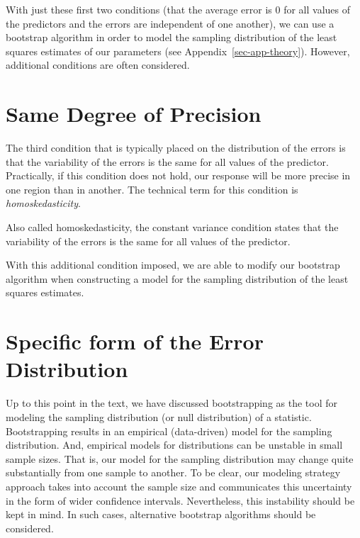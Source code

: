 \documentclass[
  letterpaper,
  DIV=11,
  numbers=noendperiod]{scrreprt}
\theoremstyle{definition}
\theoremstyle{definition}
\theoremstyle{plain}
\theoremstyle{remark}
\begin{document}
With just these first two conditions (that the average error is 0 for
all values of the predictors and the errors are independent of one
another), we can use a bootstrap algorithm in order to model the
sampling distribution of the least squares estimates of our parameters
(see Appendix~\ref{sec-app-theory}). However, additional conditions are
often considered.

\section{Same Degree of Precision}\label{same-degree-of-precision}

The third condition that is typically placed on the distribution of the
errors is that the variability of the errors is the same for all values
of the predictor. Practically, if this condition does not hold, our
response will be more precise in one region than in another. The
technical term for this condition is \emph{homoskedasticity}.

\begin{tcolorbox}[enhanced jigsaw, colbacktitle=quarto-callout-note-color!10!white, colback=white, left=2mm, title=\textcolor{quarto-callout-note-color}{\faInfo}\hspace{0.5em}{Constant Variance}, toptitle=1mm, leftrule=.75mm, breakable, bottomrule=.15mm, arc=.35mm, rightrule=.15mm, toprule=.15mm, coltitle=black, opacityback=0, colframe=quarto-callout-note-color-frame, opacitybacktitle=0.6, bottomtitle=1mm, titlerule=0mm]

Also called homoskedasticity, the constant variance condition states
that the variability of the errors is the same for all values of the
predictor.

\end{tcolorbox}

With this additional condition imposed, we are able to modify our
bootstrap algorithm when constructing a model for the sampling
distribution of the least squares estimates.

\section{Specific form of the Error
Distribution}\label{specific-form-of-the-error-distribution}

Up to this point in the text, we have discussed bootstrapping as the
tool for modeling the sampling distribution (or null distribution) of a
statistic. Bootstrapping results in an empirical (data-driven) model for
the sampling distribution. And, empirical models for distributions can
be unstable in small sample sizes. That is, our model for the sampling
distribution may change quite substantially from one sample to another.
To be clear, our modeling strategy approach takes into account the
sample size and communicates this uncertainty in the form of wider
confidence intervals. Nevertheless, this instability should be kept in
mind. In such cases, alternative bootstrap algorithms should be
considered.
\end{document}
